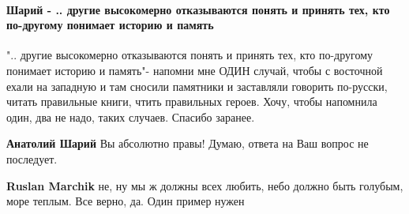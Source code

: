 
 
 
 
 
\paragraph{Шарий - .. другие высокомерно отказываются понять и принять тех, кто по-другому понимает историю и память}

\begin{itemize}
 

".. другие высокомерно отказываются понять и принять тех, кто по-другому
понимает историю и память"- напомни мне ОДИН случай, чтобы с восточной ехали на
западную и там сносили памятники и заставляли говорить по-русски, читать
правильные книги, чтить правильных героев. Хочу, чтобы напомнила один, два не
надо, таких случаев. Спасибо заранее.

\begin{itemize}
 
\textbf{Анатолий Шарий} Вы абсолютно правы! Думаю, ответа на Ваш вопрос не последует.

 

\textbf{Ruslan Marchik} не, ну мы ж должны всех любить, небо должно быть голубым, море теплым. Все верно, да. Один пример нужен

 

\end{itemize}
\end{itemize}

